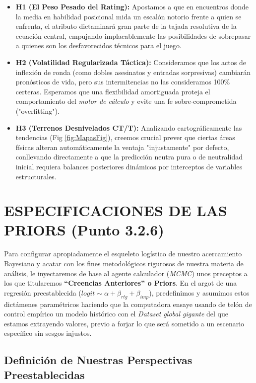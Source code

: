 \documentclass[twocolumn,10pt]{article}
\begin{document}
\begin{itemize}
    \item \textbf{H1 (El Peso Pesado del Rating):} Apostamos a que en encuentros donde la media en habilidad posicional mida un escalón notorio frente a quien se enfrenta, el atributo dictaminará gran parte de la tajada resolutiva de la ecuación central, empujando implacablemente las posibilidades de sobrepasar a quienes son los desfavorecidos técnicos para el juego.
    
    \item \textbf{H2 (Volatilidad Regularizada Táctica):} Consideramos que los actos de inflexión de ronda (como dobles asesinatos y entradas sorpresivas) cambiarán pronósticos de vida, pero sus intermitencias no las consideramos 100\% certeras. Esperamos que una flexibilidad amortiguada proteja el comportamiento del \textit{motor de cálculo} y evite una fe sobre-comprometida ("overfitting").
    
    \item \textbf{H3 (Terrenos Desnivelados CT/T):} Analizando cartográficamente las tendencias (Fig \ref{fig:MapasFig}), creemos crucial prever que ciertas áreas físicas alteran automáticamente la ventaja "injustamente" por defecto, conllevando directamente a que la predicción neutra pura o de neutralidad inicial requiera balances posteriores dinámicos por interceptos de variables estructurales.
\end{itemize}

\section{ESPECIFICACIONES DE LAS PRIORS (Punto 3.2.6)}

Para configurar apropiadamente el esqueleto logístico de nuestro acercamiento Bayesiano y acatar con los fines metodológicos rigurosos de nuestra materia de análisis, le inyectaremos de base al agente calculador (\textit{MCMC}) unos preceptos a los que titularemos \textbf{``Creencias Anteriores'' o Priors}. En el argot de una regresión preestablecida ($logit \sim \alpha + \beta_{rtg} + \beta_{imp}$), predefinimos y asumimos estos dictámenes paramétricos haciendo que la computadora ensaye usando de telón de control empírico un modelo histórico con el \textit{Dataset global gigante} del que estamos extrayendo valores, previo a forjar lo que será sometido a un escenario específico sin sesgos injustos.

\subsection{Definición de Nuestras Perspectivas Preestablecidas}
\end{document}
